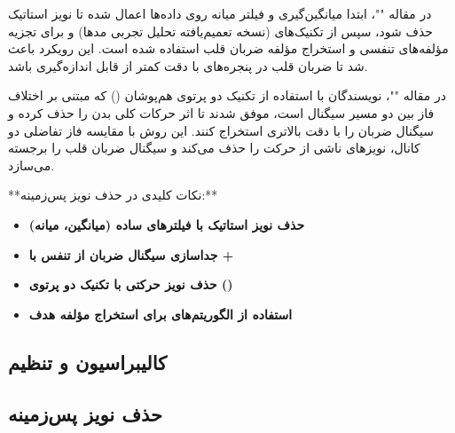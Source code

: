 در مقاله ""، ابتدا میانگین‌گیری و فیلتر میانه روی داده‌ها اعمال شده تا نویز استاتیک حذف شود، سپس از تکنیک‌های  (نسخه تعمیم‌یافته تحلیل تجربی مدها) و  برای تجزیه مؤلفه‌های تنفسی و استخراج مؤلفه ضربان قلب استفاده شده است. این رویکرد باعث شد تا ضربان قلب در پنجره‌های  با دقت کمتر از  قابل اندازه‌گیری باشد.

در مقاله ""، نویسندگان با استفاده از تکنیک دو پرتوی هم‌پوشان () که مبتنی بر اختلاف فاز بین دو مسیر سیگنال است، موفق شدند تا اثر حرکات کلی بدن را حذف کرده و سیگنال ضربان را با دقت بالاتری استخراج کنند. این روش با مقایسه فاز تفاضلی دو کانال، نویزهای ناشی از حرکت را حذف می‌کند و سیگنال ضربان قلب را برجسته می‌سازد.

**نکات کلیدی در حذف نویز پس‌زمینه:**
\begin{itemize}
    \item \textbf{حذف نویز استاتیک با فیلترهای ساده (میانگین، میانه)}
    \item \textbf{جداسازی سیگنال ضربان از تنفس با  + }
    \item \textbf{حذف نویز حرکتی با تکنیک دو پرتوی ()}
    \item \textbf{استفاده از الگوریتم‌های  برای استخراج مؤلفه هدف}
\end{itemize}

\subsection{کالیبراسیون و تنظیم } %
\label{sec:calibration-snr}

\subsection{حذف نویز پس‌زمینه} %
\label{sec:background-noise-removal}

